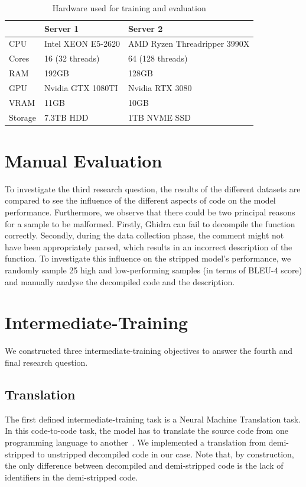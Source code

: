 \begin{table}[!h]
\centering
\begin{tabular}{l|ll}
\hline
        & Server 1           & Server 2                     \\ \hline
CPU     & Intel XEON E5-2620 & AMD Ryzen Threadripper 3990X \\
Cores   & 16 (32 threads)    & 64 (128 threads)             \\
RAM     & 192GB              & 128GB                        \\
GPU     & Nvidia GTX 1080TI  & Nvidia RTX 3080              \\
VRAM    & 11GB               & 10GB                         \\
Storage & 7.3TB HDD          & 1TB NVME SSD                
\end{tabular}
\caption{Hardware used for training and evaluation}
\label{tab:server}
\end{table}

\section{Manual Evaluation}
To investigate the third research question, the results of the different datasets are compared to see the influence of the different aspects of code on the model performance. Furthermore, we observe that there could be two principal reasons for a sample to be malformed. Firstly, Ghidra can fail to decompile the function correctly. Secondly, during the data collection phase, the comment might not have been appropriately parsed, which results in an incorrect description of the function. To investigate this influence on the stripped model's performance, we randomly sample 25 high and low-performing samples (in terms of BLEU-4 score) and manually analyse the decompiled code and the description. 

\section{Intermediate-Training}

We constructed three intermediate-training objectives to answer the fourth and final research question.

\subsection{Translation}
The first defined intermediate-training task is a Neural Machine Translation task. In this code-to-code task, the model has to translate the source code from one programming language to another~\cite{CodeXGlue}. 
We implemented a translation from demi-stripped to unstripped decompiled code in our case. Note that, by construction, the only difference between decompiled and demi-stripped code is the lack of identifiers in the demi-stripped code.

